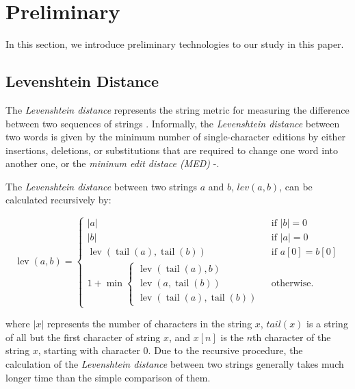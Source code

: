 \documentclass[technicalreport]{ieicej}
\begin{document}
\section{Preliminary}
\label{sec:preliminary}
    In this section, we introduce preliminary technologies to our study in this paper.

    \subsection{Levenshtein Distance}
        The {\em Levenshtein distance} represents the string metric for measuring the difference between two sequences of strings \cite{fuzzywuzzy-guidence}. Informally, the {\em Levenshtein distance} between two words is given by the minimum number of single-character editions by either insertions, deletions, or substitutions that are required to change one word into another one, or the {\em mininum edit distace (MED)} \cite{fuzzywuzzy-guidence}-\cite{levenshtein}.         

        The {\em Levenshtein distance} between two strings $a$ and $b$, $lev(a, b)$, can be calculated recursively by:

        \begin{equation}
                \operatorname{lev}(a, b)=\left\{\begin{array}{ll}
                |a| & \text { if }|b|=0 \\
                |b| & \text { if }|a|=0 \\
                \operatorname{lev}(\operatorname{tail}(a), \operatorname{tail}(b)) & \text { if } a[0]=b[0] \\
                1+\min \left\{\begin{array}{l}
                \operatorname{lev}(\operatorname{tail}(a), b) \\
                \operatorname{lev}(a, \operatorname{tail}(b)) \\
                \operatorname{lev}(\operatorname{tail}(a), \operatorname{tail}(b))
                \end{array}\right. & \text { otherwise. }
                \end{array}\right.
        \end{equation}

        where $|x|$ represents the number of characters in the string $x$, $tail(x)$ is a string of all but the first character of string $x$, and $x[n]$ is the $n$th character of the string $x$, starting with character 0. Due to the recursive procedure, the calculation of the {\em Levenshtein distance} between two strings generally takes much longer time than the simple comparison of them.
\end{document}
